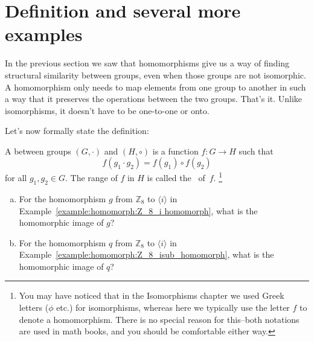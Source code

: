 \section{Definition and several more examples}
\label{sec:homomorph:several}

In  the previous section we saw that homomorphisms give us a way of finding structural similarity between groups, even when those groups are not isomorphic.  A homomorphism only needs to  map elements from one group to another in such a way that it preserves the operations between the two groups.  That's it. Unlike isomorphisms, it doesn't have to be one-to-one or onto.  

Let's now formally state the definition:

\begin{defn} \label{homomorphism_def}
A
 between groups $(G, \cdot)$ and $(H, \circ)$ is a function $f :
G \rightarrow H$ such that  
\[
f( g_1 \cdot g_2 ) = f( g_1 ) \circ f( g_2 )
\]
for all $g_1, g_2 \in G$. The range of $f$ in $H$ is called the ~of~$f$.
\footnote{You may have noticed that in the Isomorphisms chapter we used Greek letters ($\phi$ etc.) for isomorphisms, whereas here we typically use the  letter $f$ to denote a homomorphism. There is no special reason for this--both notations are used in math books, and you should be comfortable either way.}
 \end{defn}

\begin{exercise}\label{exercise:homomorph:homo_image_kernel_1}

\begin{enumerate}[(a)]
\item
For the homomorphism $g$ from ${\mathbb Z}_8$ to $\langle i \rangle$ in Example~\ref{example:homomorph:Z_8_i homomorph}, what is the homomorphic image of $g$?
\item
For the homomorphism $q$ from ${\mathbb Z}_8$ to $\langle i \rangle$ in Example~\ref{example:homomorph:Z_8_isub_homomorph}, what is the homomorphic image of $q$?
\end{enumerate}
\end{exercise}  
 
 
